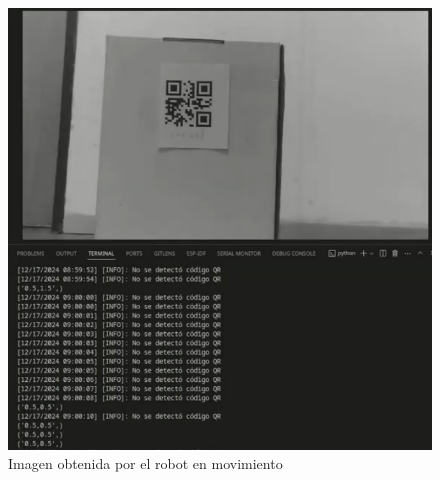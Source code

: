 \begin{figure}[H]
   \centering
   \includegraphics[width=0.7\linewidth]{images/qr.png}
   \caption{Imagen obtenida por el robot en movimiento}
   \label{fig:qrcamararobot}
\end{figure}